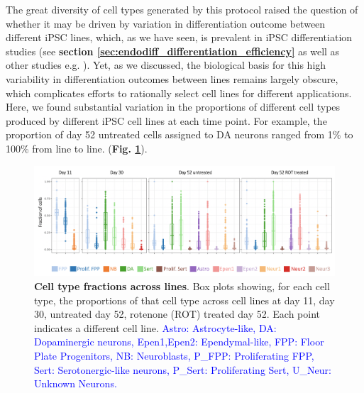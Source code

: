 The great diversity of cell types generated by this protocol raised the question of whether it may be driven by variation in differentiation outcome between different iPSC lines, which, as we have seen, is prevalent in iPSC differentiation studies (see \textbf{section \ref{sec:endodiff_differentiation_efficiency}} as well as other studies e.g. \cite{d2019association, volpato2018reproducibility}). 
Yet, as we discussed, the biological basis for this high variability in differentiation outcomes between lines remains largely obscure, which complicates efforts to rationally select cell lines for different applications. 
Here, we found substantial variation in the proportions of different cell types produced by different iPSC cell lines at each time point. 
For example, the proportion of day 52 untreated cells assigned to DA neurons ranged from 1\% to 100\% from line to line.
(\textbf{Fig. \ref{fig:neuroseq_line_variation}}).

\begin{figure}[h]
\includegraphics[width=15.5cm]{Chapter5/Fig/neuroseq_line_celltype.png}
\caption[Cell type fractions across lines]{\textbf{Cell type fractions across lines}.
Box plots showing, for each cell type, the proportions of that cell type across cell lines at day 11, day 30, untreated day 52, rotenone (ROT) treated day 52. 
Each point indicates a different cell line. 
\textcolor{blue}{Astro: Astrocyte-like, DA: Dopaminergic neurons, Epen1,Epen2: Ependymal-like, FPP: Floor Plate Progenitors, NB: Neuroblasts, P\_FPP: Proliferating FPP, Sert: Serotonergic-like neurons, P\_Sert: Proliferating Sert, U\_Neur: Unknown Neurons.}
}
\label{fig:neuroseq_line_variation}
\end{figure}


